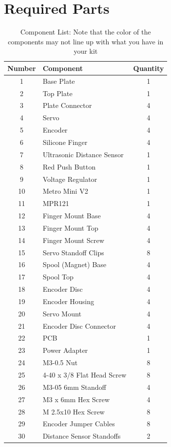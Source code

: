 \documentclass{article}
\begin{document}
\section{Required Parts}
\begin{table}[H]
    \centering
    \begin{tabular}{|c|l|c|}
        \hline
        \textbf{Number} & \textbf{Component} & \textbf{Quantity} \\
        \hline
        1  & Base Plate                & 1  \\
        2  & Top Plate                 & 1  \\
        3  & Plate Connector           & 4  \\
        4  & Servo                     & 4  \\
        5  & Encoder                   & 4  \\
        6  & Silicone Finger           & 4  \\
        7  & Ultrasonic Distance Sensor & 1  \\
        8  & Red Push Button           & 1  \\
        9  & Voltage Regulator         & 1  \\
        10 & Metro Mini V2             & 1  \\
        11 & MPR121                    & 1  \\
        12 & Finger Mount Base         & 4  \\
        13 & Finger Mount Top          & 4  \\
        14 & Finger Mount Screw        & 4  \\
        15 & Servo Standoff Clips      & 8  \\
        16 & Spool (Magnet) Base       & 4  \\
        17 & Spool Top                 & 4  \\
        18 & Encoder Disc              & 4  \\
        19 & Encoder Housing           & 4  \\
        20 & Servo Mount               & 4  \\
        21 & Encoder Disc Connector    & 4  \\
        22 & PCB                       & 1  \\
        23 & Power Adapter             & 1  \\
        24 & M3-0.5 Nut                & 8  \\
        25 & 4-40 x 3/8 Flat Head Screw & 8  \\
        26 & M3-05 6mm Standoff        & 4  \\
        27 & M3 x 6mm Hex Screw        & 4  \\
        28 & M 2.5x10 Hex Screw        & 8  \\
        29 & Encoder Jumper Cables     & 8  \\
        30 & Distance Sensor Standoffs & 2  \\
        \hline
    \end{tabular}
    \caption{Component List: Note that the color of the components may not line up with what you have in your kit}
\end{table}
\end{document}
